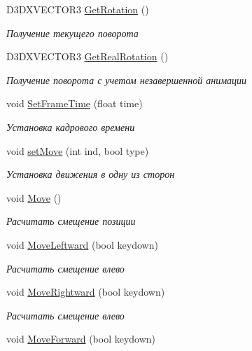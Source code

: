 \begin{DoxyCompactItemize}
D3\+D\+X\+V\+E\+C\+T\+O\+R3 \hyperlink{class_position_class_a69c69980d0ca1dbfab93ea46f6019e99}{Get\+Rotation} ()
\begin{DoxyCompactList}\small\item\em Получение текущего поворота \end{DoxyCompactList}\item 
D3\+D\+X\+V\+E\+C\+T\+O\+R3 \hyperlink{class_position_class_ad57c43e85e9b23ce99ce651bba05a609}{Get\+Real\+Rotation} ()
\begin{DoxyCompactList}\small\item\em Получение поворота с учетом незавершенной анимации \end{DoxyCompactList}\item 
void \hyperlink{class_position_class_a110e6895159c6e5335f1afaa27e7f0c8}{Set\+Frame\+Time} (float time)
\begin{DoxyCompactList}\small\item\em Установка кадрового времени \end{DoxyCompactList}\item 
void \hyperlink{class_position_class_ab710ce7a18e9102c8e9d83ad46d876c4}{set\+Move} (int ind, bool type)
\begin{DoxyCompactList}\small\item\em Установка движения в одну из сторон \end{DoxyCompactList}\item 
void \hyperlink{class_position_class_ac0870f878bebd15005ebfc010a60c397}{Move} ()
\begin{DoxyCompactList}\small\item\em Расчитать смещение позиции \end{DoxyCompactList}\item 
void \hyperlink{class_position_class_a52e44d399211839638b927e1aa74d585}{Move\+Leftward} (bool keydown)
\begin{DoxyCompactList}\small\item\em Расчитать смещение влево \end{DoxyCompactList}\item 
void \hyperlink{class_position_class_a541daa8f1f943f69f8406cec69c2b2d4}{Move\+Rightward} (bool keydown)
\begin{DoxyCompactList}\small\item\em Расчитать смещение влево \end{DoxyCompactList}\item 
void \hyperlink{class_position_class_aa777754a1af56bda1ebf153a117cef85}{Move\+Forward} (bool keydown)

\end{DoxyCompactItemize}

